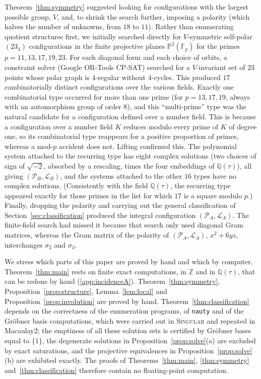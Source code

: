 \documentclass[11pt]{article}
\theoremstyle{plain}
\theoremstyle{definition}
\newcommand{\QQ}{\mathbb{Q}}
\newcommand{\FF}{\mathbb{F}}
\newcommand{\ZZ}{\mathbb{Z}}
\newcommand{\PP}{\mathbb{P}}
\newcommand{\cP}{\mathcal{P}}
\newcommand{\cL}{\mathcal{L}}
\begin{document}
Theorem~\ref{thm:symmetry} suggested looking for configurations with the largest possible group, $V$, and, to shrink the search further, imposing a polarity (which halves the number of unknowns, from $18$ to $11$).  Rather than enumerating quotient structures first, we initially searched directly for $V$-symmetric self-polar $(23_4)$ configurations in the finite projective planes $\PP^2(\FF_p)$ for the primes $p=11,13,17,19,23$.  For each diagonal form and each choice of orbits, a constraint solver (Google OR-Tools CP-SAT) searched for a $V$-invariant set of $23$ points whose polar graph is $4$-regular without $4$-cycles.  This produced $17$ combinatorially distinct configurations over the various fields.  Exactly one combinatorial type occurred for more than one prime (for $p=13,17,19$, always with an automorphism group of order $8$), and this ``multi-prime'' type was the natural candidate for a configuration defined over a number field. This is because a configuration over a number field $K$ reduces modulo every prime of $K$ of degree one, so its combinatorial type reappears for a positive proportion of primes, whereas a mod-$p$ accident does not.  Lifting confirmed this.  The polynomial system attached to the recurring type has eight complex solutions (two choices of sign of $\sqrt{-2}$, absorbed by a rescaling, times the four embeddings of $\QQ(\tau)$), all giving $(\cP_B,\cL_B)$, and the systems attached to the other $16$ types have no complex solutions.  (Consistently with the field $\QQ(\tau)$, the recurring type appeared exactly for those primes in the list for which $17$ is a square modulo $p$.)  Finally, dropping the polarity and carrying out the general classification of Section~\ref{sec:classification} produced the integral configuration $(\cP_A,\cL_A)$.  The finite-field search had missed it because that search only used diagonal Gram matrices, whereas the Gram matrix of the polarity of $(\cP_A,\cL_A)$, $x^2+6yz$, interchanges $\sigma_2$ and $\sigma_3$.

We stress which parts of this paper are proved by hand and which by computer.  Theorem~\ref{thm:main} rests on finite exact computations, in $\ZZ$ and in $\QQ(\tau)$, that can be redone by hand (\ref{app:incidenceA}).  Theorem~\ref{thm:symmetry}, Proposition~\ref{prop:structure}, Lemma~\ref{lem:local} and Proposition~\ref{prop:involution} are proved by hand.  Theorem~\ref{thm:classification} depends on the correctness of the enumeration programs, of \texttt{nauty} and of the Gr\"obner basis computations, which were carried out in \textsc{Singular} and repeated in Macaulay2; the emptiness of all these solution sets is certified by Gr\"obner bases equal to $\{1\}$, the degenerate solutions in Proposition~\ref{prop:solve}(a) are excluded by exact saturations, and the projective equivalences in Proposition~\ref{prop:solve}(b) are exhibited exactly.  The proofs of Theorems~\ref{thm:main}, \ref{thm:symmetry} and~\ref{thm:classification} therefore contain no floating-point computation.
\end{document}
